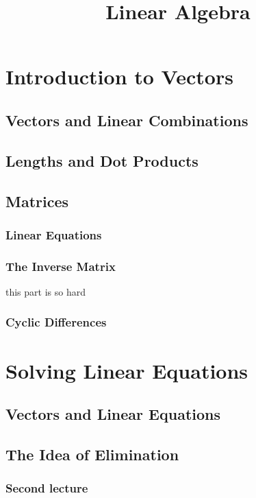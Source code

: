 \documentclass{book}
\begin{document}
\tableofcontents

\title{Linear Algebra}

\chapter{Introduction to Vectors}

\section{Vectors and Linear Combinations}

\section{Lengths and Dot Products}

\section{Matrices}

\subsection{Linear Equations}

\subsection{The Inverse Matrix}
this part is so hard

\subsection{Cyclic Differences}





\chapter{Solving Linear Equations}
\section{Vectors and Linear Equations}

\section{The Idea of Elimination}
\subsection*{Second lecture}
\end{document}
